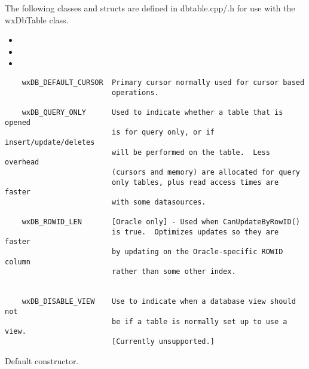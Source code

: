 The following classes and structs are defined in dbtable.cpp/.h for use
with the wxDbTable class.

\begin{itemize}\itemsep=0pt
\item {}
\item {}
\item {}
\end{itemize}


\begin{verbatim}
    wxDB_DEFAULT_CURSOR  Primary cursor normally used for cursor based
                         operations.

    wxDB_QUERY_ONLY      Used to indicate whether a table that is opened
                         is for query only, or if insert/update/deletes
                         will be performed on the table.  Less overhead
                         (cursors and memory) are allocated for query
                         only tables, plus read access times are faster
                         with some datasources.

    wxDB_ROWID_LEN       [Oracle only] - Used when CanUpdateByRowID()
                         is true.  Optimizes updates so they are faster
                         by updating on the Oracle-specific ROWID column
                         rather than some other index.


    wxDB_DISABLE_VIEW    Use to indicate when a database view should not
                         be if a table is normally set up to use a view.
                         [Currently unsupported.]

\end{verbatim}



\label{wxdbtableconstr}


Default constructor.


